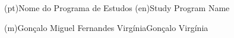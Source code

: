 \ntdegreename*(pt){Nome do Programa de Estudos}
\ntdegreename*(en){Study Program Name}




\ntauthorname(m){Gonçalo Miguel Fernandes Virgínia}{Gonçalo Virgínia}


